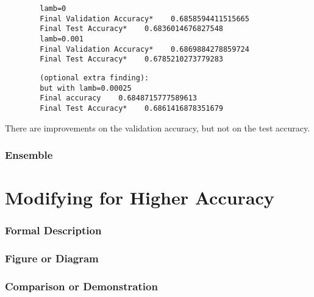 \documentclass{article}
\begin{document}
    \begin{verbatim}
        lamb=0
        Final Validation Accuracy*    0.6858594411515665
        Final Test Accuracy*    0.6836014676827548
        lamb=0.001
        Final Validation Accuracy*    0.6869884278859724
        Final Test Accuracy*    0.6785210273779283
    \end{verbatim}

    \begin{verbatim}
        (optional extra finding):
        but with lamb=0.00025
        Final accuracy    0.6848715777589613
        Final Test Accuracy*    0.6861416878351679
    \end{verbatim}

    There are improvements on the validation accuracy, but not on the test accuracy.


    \pagebreak

    \section{Ensemble}

    \pagebreak

    \part{Modifying for Higher Accuracy}
    \section{Formal Description}
    \section{Figure or Diagram}
    \section{Comparison or Demonstration}
\end{document}
